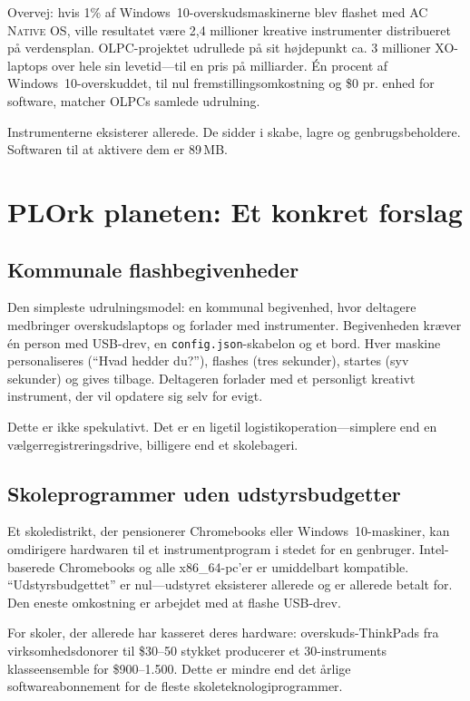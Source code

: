 \documentclass[10pt,letterpaper,twocolumn]{article}
\newcommand{\acos}{\textsc{AC Native OS}}
\begin{document}
Overvej: hvis 1\% af Windows~10-overskudsmaskinerne blev flashet med \acos{}, ville resultatet v{\ae}re 2,4 millioner kreative instrumenter distribueret p{\aa} verdensplan. OLPC-projektet udrullede p{\aa} sit h{\o}jdepunkt ca. 3 millioner XO-laptops over hele sin levetid---til en pris p{\aa} milliarder. \'{E}n procent af Windows~10-overskuddet, til nul fremstillingsomkostning og \$0 pr. enhed for software, matcher OLPCs samlede udrulning.

Instrumenterne eksisterer allerede. De sidder i skabe, lagre og genbrugsbeholdere. Softwaren til at aktivere dem er 89\,MB.


\section{PLOrk planeten: Et konkret forslag}
\label{sec:proposal}

\subsection{Kommunale flashbegivenheder}

Den simpleste udrulningsmodel: en kommunal begivenhed, hvor deltagere medbringer overskudslaptops og forlader med instrumenter. Begivenheden kr{\ae}ver \'{e}n person med USB-drev, en \texttt{config.json}-skabelon og et bord. Hver maskine personaliseres (``Hvad hedder du?''), flashes (tres sekunder), startes (syv sekunder) og gives tilbage. Deltageren forlader med et personligt kreativt instrument, der vil opdatere sig selv for evigt.

Dette er ikke spekulativt. Det er en ligetil logistikoperation---simplere end en v{\ae}lgerregistreringsdrive, billigere end et skolebageri.

\subsection{Skoleprogrammer uden udstyrsbudgetter}

Et skoledistrikt, der pensionerer Chromebooks eller Windows~10-maskiner, kan omdirigere hardwaren til et instrumentprogram i stedet for en genbruger. Intel-baserede Chromebooks og alle x86\_64-pc'er er umiddelbart kompatible. ``Udstyrsbudgettet'' er nul---udstyret eksisterer allerede og er allerede betalt for. Den eneste omkostning er arbejdet med at flashe USB-drev.

For skoler, der allerede har kasseret deres hardware: overskuds-ThinkPads fra virksomhedsdonorer til \$30--50 stykket producerer et 30-instruments klasseensemble for \$900--1.500. Dette er mindre end det {\aa}rlige softwareabonnement for de fleste skoleteknologiprogrammer.
\end{document}
